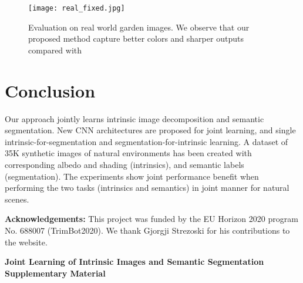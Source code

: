 \documentclass[runningheads]{llncs}
\begin{document}
\begin{figure}[t]
    \centering
    \texttt{[image: real\_fixed.jpg]}
    \caption{Evaluation on real world garden images. We observe that our proposed method capture better colors and sharper outputs compared with \cite{shi}}
    \label{fig:real}
\end{figure}

\section{Conclusion}
Our approach jointly learns intrinsic image decomposition and semantic segmentation. New CNN architectures are proposed for joint learning, and single intrinsic-for-segmentation and segmentation-for-intrinsic learning. A dataset of 35K synthetic images of natural environments has been created with corresponding albedo and shading (intrinsics), and semantic labels (segmentation). The experiments show joint performance benefit when performing the two tasks (intrinsics and semantics) in joint manner for natural scenes.

\noindent \textbf{Acknowledgements:} This project was funded by the EU Horizon 2020 program No. 688007 (TrimBot2020). We thank Gjorgji Strezoski for his contributions to the website.

\clearpage




\newpage

\begin{center}
\textbf{\large Joint Learning of Intrinsic Images and Semantic Segmentation Supplementary Material}
\end{center}

\setcounter{equation}{0}
\setcounter{figure}{0}
\setcounter{table}{0}
\setcounter{section}{0}
\setcounter{page}{1}
\makeatletter
\renewcommand{\theequation}{S\arabic{equation}}
\renewcommand{\thefigure}{S\arabic{figure}}
\renewcommand{\thesection}{S\arabic{section}}
\end{document}
